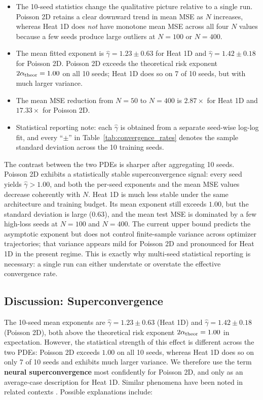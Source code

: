 \documentclass[12pt,a4paper]{article}
\begin{document}
\begin{itemize}
    \item The 10-seed statistics change the qualitative picture relative to a
        single run.  Poisson 2D retains a clear downward trend in mean MSE as
        $N$ increases, whereas Heat 1D does \emph{not} have monotone mean MSE
        across all four $N$ values because a few seeds produce large outliers
        at $N=100$ or $N=400$.
    \item The mean fitted exponent is $\hat\gamma = 1.23 \pm 0.63$ for Heat 1D
        and $\hat\gamma = 1.42 \pm 0.18$ for Poisson 2D.  Poisson 2D exceeds the
        theoretical risk exponent $2\alpha_{\rm theor}=1.00$ on all 10 seeds;
        Heat 1D does so on 7 of 10 seeds, but with much larger variance.
    \item The mean MSE reduction from $N=50$ to $N=400$ is $2.87\times$ for
        Heat 1D and $17.33\times$ for Poisson 2D.
    \item Statistical reporting note: each $\hat\gamma$ is obtained from a
        separate seed-wise log-log fit, and every ``$\pm$'' in
        Table~\ref{tab:convergence_rates} denotes the sample standard deviation
        across the 10 training seeds.
\end{itemize}

The contrast between the two PDEs is sharper after aggregating 10 seeds.
Poisson 2D exhibits a statistically stable superconvergence signal:
every seed yields $\hat\gamma > 1.00$, and both the per-seed exponents
and the mean MSE values decrease coherently with $N$.
Heat 1D is much less stable under the same architecture and training budget.
Its mean exponent still exceeds $1.00$, but the standard deviation is large
($0.63$), and the mean test MSE is dominated by a few high-loss seeds at
$N=100$ and $N=400$.  The current upper bound predicts the asymptotic
exponent but does not control finite-sample variance across optimizer
trajectories; that variance appears mild for Poisson 2D and pronounced for
Heat 1D in the present regime.  This is exactly why multi-seed statistical
reporting is necessary: a single run can either understate or overstate the
effective convergence rate.

\subsection{Discussion: Superconvergence}
\label{sec:superconvergence}

The 10-seed mean exponents are $\hat\gamma=1.23 \pm 0.63$ (Heat 1D) and
$\hat\gamma=1.42 \pm 0.18$ (Poisson 2D), both above the theoretical risk
exponent $2\alpha_{\rm theor}=1.00$ in expectation.
However, the statistical strength of this effect is different across the two PDEs:
Poisson 2D exceeds $1.00$ on all 10 seeds, whereas Heat 1D does so on only 7 of
10 seeds and exhibits much larger variance.  We therefore use the term
\textbf{neural superconvergence} most confidently for Poisson 2D, and only as an
average-case description for Heat 1D.  Similar phenomena have been noted in
related contexts \citep{brugiapaglia2026tour,kutyniok2022nn}.
Possible explanations include:
\end{document}
